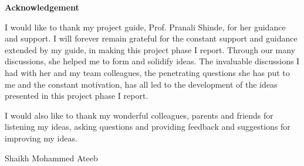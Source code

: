 \begin{center}
\bfseries \fontsize{24}{12} \selectfont Acknowledgement
\end{center}
\vspace*{1\baselineskip}
\hspace*{0.5in}I would like to thank my project guide, Prof. Pranali Shinde, for her guidance and support. I will forever remain grateful for the constant support and guidance extended by my guide, in making this project phase I report. Through our many discussions, she helped me to form and solidify ideas. The invaluable discussions I had with her and my team colleagues, the penetrating questions she has put to me and the constant motivation, has all led to the development of the ideas presented in this project phase I report.

\vspace{\baselineskip}
\hspace{0.6cm}I would also like to thank my wonderful colleagues, parents and friends for listening my ideas, asking questions and providing feedback and suggestions for improving my ideas.\\

\vspace*{3\baselineskip}
\begin{flushright}
Shaikh Mohammed Ateeb \\

\end{flushright}
